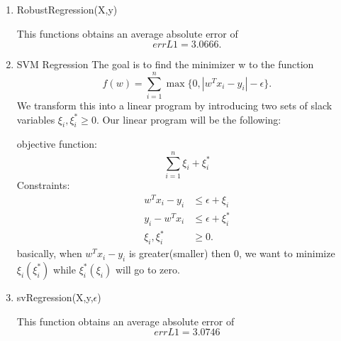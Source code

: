 \begin{enumerate}
\item RobustRegression(X,y)




This functions obtains an average absolute error of
\begin{equation}
errL1 = 3.0666.
\end{equation}

\par\item SVM Regression
The goal is to find the minimizer w to the function
\begin{equation}
f(w) = \sum_{i=1}^{n}\max\{0,|w^{T}x_{i}-y_{i}|-\epsilon\}.
\end{equation}
We transform this into a linear program by introducing two sets of slack variables $\xi_{i},\xi_{i}^{*}\ge 0$.  Our linear program will be the following:
\par objective function: 
\begin{equation}
\sum_{i=1}^{n} \xi_{i}+\xi_{i}^{*}
\end{equation}
\newline Constraints:
\begin{align}
w^{T}x_{i}-y_{i}&\le \epsilon+\xi_{i}\\
y_{i}-w^{T}x_{i}&\le \epsilon+\xi_{i}^{*}\\
\xi_{i},\xi_{i}^{*}&\ge 0.
\end{align}
basically, when $w^{T}x_{i}-y_{i}$ is greater(smaller) then 0, we want to minimize $\xi_{i}(\xi_{i}^{*})$ while $\xi_{i}^{*}(\xi_{i})$ will go to zero.  

\par\item svRegression(X,y,$\epsilon$)

This function obtains an average absolute error of
\begin{equation}
errL1 = 3.0746
\end{equation}
\end{enumerate}